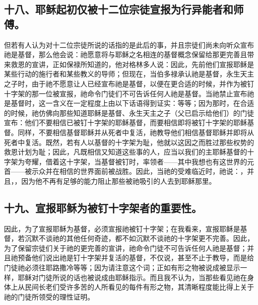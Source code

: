 
\subsection{十八、耶稣起初仅被十二位宗徒宣报为行异能者和师傅。}

但若有人认为对十二位宗徒所说的话指的是此后的事，并且宗徒们尚未向听众宣布祂是基督，那么他会说：祂愿意将与耶稣之名相连的基督概念保留给那更完善且带来救恩的宣讲，正如保禄所知道的，他对格林多人说：因此，先前他们宣报耶稣是某些行动的施行者和某些教义的导师；但现在，当伯多禄承认祂是基督，永生天主之子时，由于祂不愿意让人已经宣布祂是基督，以便在更合适的时候，并作为被钉十字架的那一位被宣报，祂命令门徒们不可告诉任何人祂是基督。当祂禁止宣布祂是基督时，这一含义在一定程度上由以下话语得到证实：等等；因为那时，在合适的时候，祂仿佛向那些知道耶稣是基督、永生天主之子（父已启示给他们）的门徒宣布：他们不要相信已被钉十字架的耶稣基督，而要相信即将被钉十字架的耶稣基督。同样，不要相信基督耶稣并从死者中复活，祂教导他们相信基督耶稣并即将从死者中复活。既然，若有人以基督的十字架为耻，他就以这因之而胜过那些权势的救恩计划为耻；因此，凡既相信又知道这些事的人，应当以我们的主耶稣基督的十字架为夸耀，借着这十字架，当基督被钉时，率领者——其中我想也有这世界的元首——被示众并在相信的世界面前被战胜。因此，当祂的受难临近时，祂说：，并且，，因为他不再有足够的能力阻止那些被祂吸引的人去到耶稣那里。\par


\subsection{十九、宣报耶稣为被钉十字架者的重要性。}

因此，为了宣报耶稣为基督，必须宣报祂被钉十字架；在我看来，宣报耶稣是基督，若沉默不谈祂的其他任何奇迹，都不如沉默不谈祂的十字架更不完善。因此，为了保留宗徒们关于祂的更完善的宣讲，祂命令门徒不可告诉任何人祂是基督；并且祂预备他们说出祂是钉十字架并复活的基督，不仅说，甚至不止于教导，而是给门徒祂必须往耶路撒冷等等；因为请注意这个词；正如有形之物被说成被显示一样，耶稣对门徒所说的话也被说成由耶稣指示。而且我不认为，当那些看见祂在身体上从民间长老们受许多苦的人所看见的每件有形之物，其清晰程度能比得上关于祂的门徒所领受的理性证明。\par

